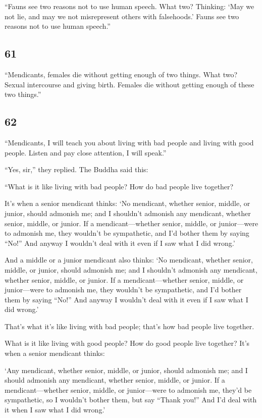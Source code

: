 \documentclass[12pt,openany]{book}%
\begin{document}
“Fauns see two reasons not to use human speech. What two? Thinking: ‘May we not lie, and may we not misrepresent others with falsehoods.’ Fauns see two reasons not to use human speech.” 

\subsection*{61 }

“Mendicants, females die without getting enough of two things. What two? Sexual intercourse and giving birth. Females die without getting enough of these two things.” 

\subsection*{62 }

“Mendicants, I will teach you about living with bad people and living with good people. Listen and pay close attention, I will speak.” 

“Yes, sir,” they replied. The Buddha said this: 

“What is it like living with bad people? How do bad people live together? 

It’s when a senior mendicant thinks: ‘No mendicant, whether senior, middle, or junior, should admonish me; and I shouldn’t admonish any mendicant, whether senior, middle, or junior. If a mendicant—whether senior, middle, or junior—were to admonish me, they wouldn’t be sympathetic, and I’d bother them by saying “No!” And anyway I wouldn’t deal with it even if I saw what I did wrong.’ 

And a middle or a junior mendicant also thinks: ‘No mendicant, whether senior, middle, or junior, should admonish me; and I shouldn’t admonish any mendicant, whether senior, middle, or junior. If a mendicant—whether senior, middle, or junior—were to admonish me, they wouldn’t be sympathetic, and I’d bother them by saying “No!” And anyway I wouldn’t deal with it even if I saw what I did wrong.’ 

That’s what it’s like living with bad people; that’s how bad people live together. 

What is it like living with good people? How do good people live together? It’s when a senior mendicant thinks: 

‘Any mendicant, whether senior, middle, or junior, should admonish me; and I should admonish any mendicant, whether senior, middle, or junior. If a mendicant—whether senior, middle, or junior—were to admonish me, they’d be sympathetic, so I wouldn’t bother them, but say “Thank you!” And I’d deal with it when I saw what I did wrong.’ 
\end{document}
